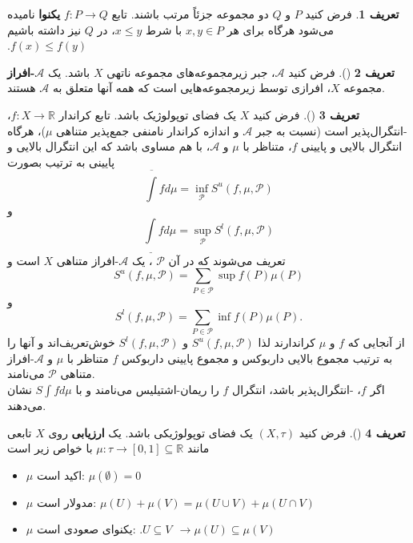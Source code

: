 \documentclass[12pt,a4paper]{article}
\theoremstyle{definition}
\newtheorem{definition}{تعریف}[section]
\theoremstyle{theorem}
\theoremstyle{definition}
\newcommand{\bR}{\mathbb{R}}
\begin{document}
\begin{definition}
 فرض کنید 
 $ P $
 و
 $ Q $
 دو مجموعه جزئاً مرتب باشند.  تابع 
 $ f:P\rightarrow  Q$
 \textbf{یکنوا}
 نامیده می‌شود هرگاه برای هر 
 $ x,y\in P $
 با شرط 
 $ x\leq y $، در 
 $ Q $
 نیز داشته باشیم
 $ .f(x)\leq f(y) $
 \end{definition}
\begin{definition}[\cite{lawson 2}]
فرض کنید 
$ \mathcal{A} $،   جبر زیرمجموعه‌های مجموعه ناتهی $  X$
 باشد.  یک 
\textbf{$\mathcal{A} $-افراز}
مجموعه $ X $، افرازی توسط زیرمجموعه‌هایی است که همه آنها متعلق به  
$ \mathcal{A} $
 هستند.
\end{definition}
\begin{definition}[\cite{lawson 2}]
فرض کنید $ X $ یک فضای توپولوژیک باشد.  
تابع کراندار $ f:X\rightarrow \bR $، -انتگرال‌پذیر 
است (نسبت به جبر $ \mathcal{A} $ و اندازه کراندار نامنفی جمع‌پذیر متناهی $  \mu$)،  هرگاه انتگرال بالایی و پایینی $ f $،  متناظر با $ \mu $ و $  \mathcal{A} $، با هم مساوی باشد که این انتگرال بالایی و پایینی به ترتیب  بصورت 
$$\overline{\int}fd\mu=\inf_{\mathcal{P}}S^{u}(f,\mu,\mathcal{P})$$
و
$$\underline{\int}fd\mu=\sup_{\mathcal{P}}S^{l}(f,\mu,\mathcal{P})$$
تعریف می‌شوند که در آن 
$ \mathcal{P} $
، یک $\mathcal{A} $-افراز متناهی $ X $  است و 
$$S^{u}(f,\mu,\mathcal{P})=\sum_{P\in\mathcal{P}} \sup f(P)\mu(P)$$
و
$$S^{l}(f,\mu,\mathcal{P})=\sum_{P\in\mathcal{P}}\inf f(P)\mu(P).$$
از آنجایی که $  f$ و $  \mu$ کراندارند لذا 
$S^{u}(f,\mu,\mathcal{P})$
و
$S^{l}(f,\mu,\mathcal{P})$
خوش‌تعریف‌اند و آنها را به ترتیب مجموع بالایی داربوکس
 و مجموع پایینی داربوکس $ f $ متناظر با $ \mu $ و
$\mathcal{A} $-افراز 
متناهی $ \mathcal{P} $ می‌نامند.\\
اگر $  f$، -انتگرال‌پذیر             باشد، انتگرال $  f$ را ریمان-اشتیلیس
 می‌نامند و با 
$ S\int fd\mu $ 
نشان می‌دهند.
\end{definition}
\begin{definition}[\cite{Jung and Tix}]
فرض کنید
$ (X,\tau) $
یک فضای توپولوژیکی باشد.   یک
\textbf{ارزیابی}%
%
روی 
$ X $
  تابعی مانند 
$ \mu:\tau\rightarrow [0,1]\subseteq \bR $
با خواص زیر است
\begin{itemize}
\item
$ \mu $
اکید است:
$ \mu(\emptyset)=0 $
\item
$ \mu $
مدولار 
است:
$ \mu(U)+\mu(V)=\mu(U\cup V)+\mu(U\cap V) $
\item
$ \mu $
 یکنوای صعودی است:
$ .U\subseteq V \ \ \rightarrow \mu(U)\subseteq \mu(V) $
\end{itemize}
\end{definition}
\end{document}

